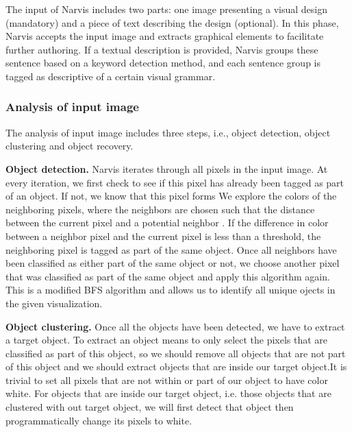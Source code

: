 The input of Narvis includes two parts: one image presenting a visual design (mandatory) and a piece of text describing the design (optional). In this phase, Narvis accepts the input image and extracts graphical elements to facilitate further authoring. If a textual description is provided, Narvis groups these sentence based on a keyword detection method, and each sentence group is tagged as descriptive of a certain visual grammar.

\subsubsection{Analysis of input image}
The analysis of input image includes three steps, i.e., object detection, object clustering and object recovery.

\textbf{Object detection.} Narvis iterates through all pixels in the input image. At every iteration, we first check to see if this pixel has already been tagged as part of an object. If not, we know that this pixel forms  We explore the colors of the neighboring pixels, where the neighbors are chosen such that the distance between the current pixel and a potential neighbor . If the difference in color between a neighbor pixel and the current pixel is less than a threshold, the neighboring pixel is tagged as part of the same object. Once all neighbors have been classified as either part of the same object or not, we choose another pixel that was classified as part of the same object and apply this algorithm again. This is a modified BFS algorithm and allows us to identify all unique ojects in the given visualization.

\textbf{Object clustering.} Once all the objects have been detected, we have to extract a target object. To extract an object means to only select the pixels that are classified as part of this object, so we should remove all objects that are not part of this object and we should extract objects that are inside our target object.It is trivial to set all pixels that are not within or part of our object to have color white. For objects that are inside our target object, i.e. those objects that are clustered with out target object, we will first detect that object then programmatically change its pixels to white.

